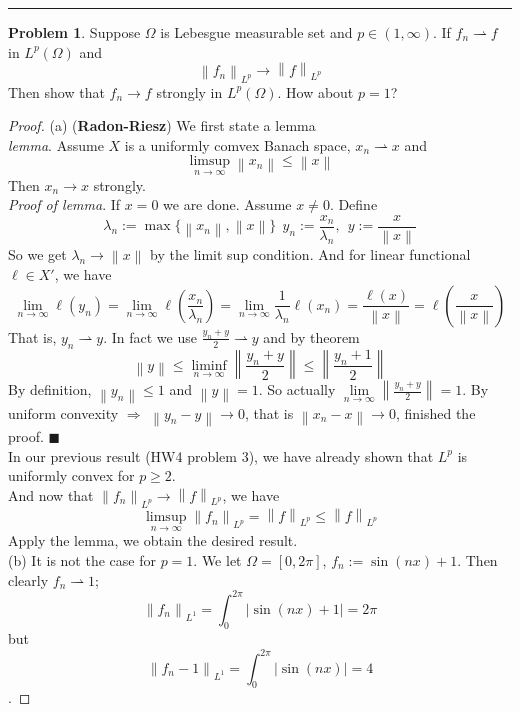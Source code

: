 \documentclass[a4paper, 10pt]{article}
\theoremstyle{definition}
\newtheorem{problem}{Problem}
\theoremstyle{hSol}
\begin{document}
\noindent\rule{16cm}{0.4pt}
\begin{problem} Suppose $\Omega$ is Lebesgue measurable set and $p\in (1,\infty)$. If $f_n \rightharpoonup f$ in $L^p(\Omega)$ and
$$
\left\|f_n\right\|_{L^p} \to \left\|f\right\|_{L^p}
$$
Then show that $f_n \to f$ strongly in $L^p(\Omega)$. How about $p=1$?
\end{problem}
\begin{proof} (a) (\textbf{Radon-Riesz}) We first state a lemma\\
\textit{lemma}. Assume $X$ is a uniformly comvex Banach space, $x_n \rightharpoonup x$ and
$$
\limsup\limits_{n\rightarrow\infty} \left\|x_n\right\| \leq \left\|x\right\|
$$
Then $x_n \to x$ strongly.\\
\textit{Proof of lemma}. If $x=0$ we are done. Assume $x\ne 0$. Define
$$
\lambda_n := \max\{\left\|x_n\right\|, \left\|x\right\|\}~~y_n:=\frac{x_n}{\lambda_n},~~y:=\frac{x}{\left\|x\right\|}
$$
So we get $\lambda_n \to \left\|x\right\|$ by the limit sup condition. And for linear functional $\ell\in X'$, we have 
\begin{equation}
  \lim\limits_{n\rightarrow\infty}\ell(y_n) = \lim\limits_{n\rightarrow\infty}\ell\left(\frac{x_n}{\lambda_n}\right) = \lim\limits_{n\rightarrow\infty}\frac{1}{\lambda_n}\ell(x_n) = \frac{\ell(x)}{\left\|x\right\|} = \ell\left(\frac{x}{\left\|x\right\|}\right)
\end{equation}
That is, $y_n \rightharpoonup y$. In fact we use $\frac{y_n + y}{2} \rightharpoonup y$ and by theorem
\begin{equation}
  \left\|y\right\| \leq \liminf\limits_{n\rightarrow\infty} \left\|\frac{y_n+y}{2}\right\| \leq \left\|\frac{y_n+1}{2}\right\|
\end{equation}
By definition, $\left\|y_n\right\|\leq 1$ and $\left\|y\right\|=1$. So actually $\lim\limits_{n\rightarrow\infty}\left\|\frac{y_n+y}{2}\right\| = 1$. By uniform convexity $\Rightarrow$ $\left\|y_n-y\right\|\to 0$, that is $\left\|x_n-x\right\|\to 0$, finished the proof. $\blacksquare$\\
In our previous result (HW4 problem 3), we have already shown that $L^p$ is uniformly convex for $p\geq 2$. \\
And now that $\left\|f_n\right\|_{L^p} \to \left\|f\right\|_{L^p}$, we have
$$
\limsup\limits_{n\rightarrow\infty}\left\|f_n\right\|_{L^p} = \left\|f\right\|_{L^p} \leq \left\|f\right\|_{L^p}
$$
Apply the lemma, we obtain the desired result. \\
(b) It is not the case for $p=1$. We let $\Omega=[0,2\pi]$, $f_n := \sin(nx)+1$. Then clearly $f_n \rightharpoonup 1$; 
$$\left\|f_n\right\|_{L^1}=\int_0^{2\pi}|\sin(nx)+1|=2\pi$$
but 
$$\left\|f_n - 1\right\|_{L^1} = \int_0^{2\pi}|\sin(nx)|=4$$.
\end{proof}
\end{document}
